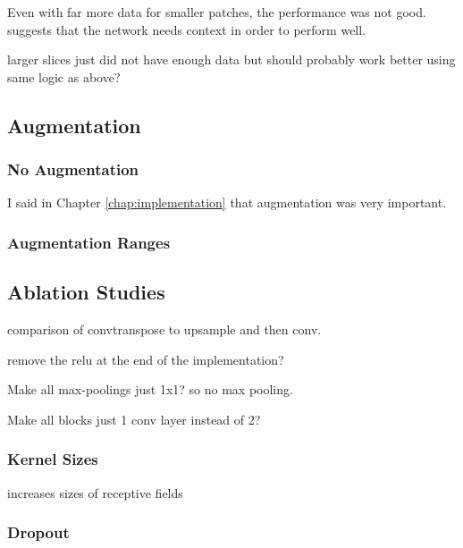 Even with far more data for smaller patches, the performance was not good. suggests that the network needs context in order to perform well.

larger slices just did not have enough data but should probably work better using same logic as above?

\subsection{Augmentation}
\label{sec:evalaugmentation}

\subsubsection{No Augmentation}

I said in Chapter \ref{chap:implementation} that augmentation was very important.

\subsubsection{Augmentation Ranges}

\subsection{Ablation Studies}

comparison of convtranspose to upsample and then conv.

remove the relu at the end of the implementation?

Make all max-poolings just 1x1? so no max pooling.

Make all blocks just 1 conv layer instead of 2?

\subsubsection{Kernel Sizes}

increases sizes of receptive fields

\subsubsection{Dropout}


